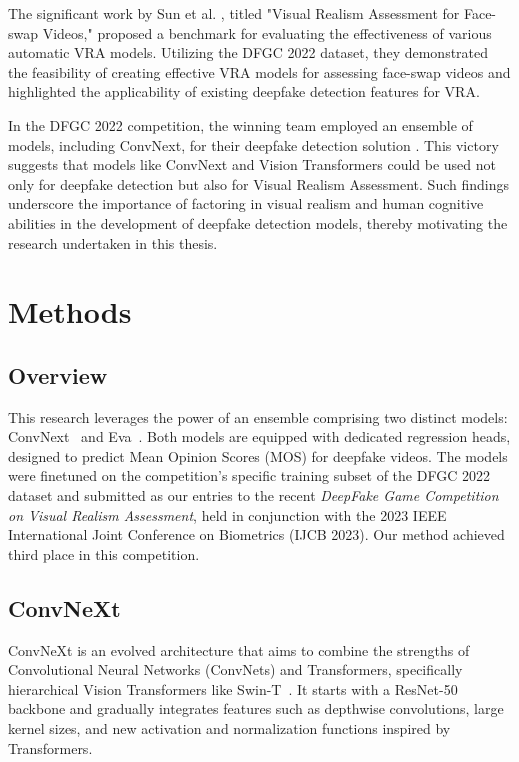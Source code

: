 \documentclass[a4paper,12pt,openright]{book}
\begin{document}
The significant work by Sun et al. \cite{sun2023visual}, titled "Visual Realism Assessment for Face-swap Videos," proposed a benchmark for evaluating the effectiveness of various automatic VRA models. Utilizing the DFGC 2022 dataset, they demonstrated the feasibility of creating effective VRA models for assessing face-swap videos and highlighted the applicability of existing deepfake detection features for VRA.

In the DFGC 2022 competition, the winning team employed an ensemble of models, including ConvNext, for their deepfake detection solution \cite{peng2022dfgc}. This victory suggests that models like ConvNext and Vision Transformers could be used not only for deepfake detection but also for Visual Realism Assessment. Such findings underscore the importance of factoring in visual realism and human cognitive abilities in the development of deepfake detection models, thereby motivating the research undertaken in this thesis.

\chapter{Methods}
\label{chap:methods}

\section{Overview}

This research leverages the power of an ensemble comprising two distinct models:
ConvNext~\cite{DBLP:journals/corr/abs-2201-03545} and Eva~\cite{fang2022eva}. Both models are equipped with dedicated regression heads, designed to predict Mean Opinion Scores (MOS) for deepfake videos. The models were finetuned on the competition's specific training subset of the DFGC 2022 dataset and submitted as our entries to the recent \textit{DeepFake Game Competition on Visual Realism Assessment}, held in conjunction with the 2023 IEEE International Joint Conference on Biometrics (IJCB 2023). Our method achieved third place in this competition.

\section{ConvNeXt}
\label{sec:convnext}

ConvNeXt is an evolved architecture that aims to combine the strengths of Convolutional Neural Networks (ConvNets) and Transformers, specifically hierarchical Vision Transformers like Swin-T~\cite{DBLP:journals/corr/abs-2103-14030}. It starts with a ResNet-50~\cite{DBLP:journals/corr/HeZRS15} backbone and gradually integrates features such as depthwise convolutions, large kernel sizes, and new activation and normalization functions inspired by Transformers.
\end{document}
